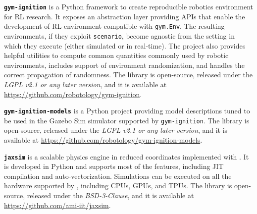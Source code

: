 \vspace{3mm}
\noindent
\textbf{\texttt{gym-ignition}} is a Python framework to create reproducible robotics environment for \ac{RL} research. It exposes an abstraction layer providing \acp{API} that enable the development of \ac{RL} environment compatible with \texttt{gym.Env}. The resulting environments, if they exploit \texttt{scenario},  become agnostic from the setting in which they execute (either simulated or in real-time). The project also provides helpful utilities to compute common quantities commonly used by robotic environments, includes support of environment randomization, and handles the correct propagation of randomness. The library is open-source, released under the \emph{LGPL v2.1 or any later version}, and it is available at \linebreak \url{https://github.com/robotology/gym-ignition}.

\vspace{3mm}
\noindent
\textbf{\texttt{gym-ignition-models}} is a Python project providing model descriptions tuned to be used in the Gazebo Sim simulator supported by \texttt{gym-ignition}. The library is open-source, released under the \emph{LGPL v2.1 or any later version}, and it is available at \url{https://github.com/robotology/gym-ignition-models}.

\vspace{3mm}
\noindent
\textbf{\texttt{jaxsim}} is a scalable physics engine in reduced coordinates implemented with \jax. It is developed in Python and supports most of the \jax features, including \ac{JIT} compilation and auto-vectorization. Simulations can be executed on all the hardware supported by \jax, including \acp{CPU}, \acp{GPU}, and \acp{TPU}. The library is open-source, released under the \emph{BSD-3-Clause}, and it is available at \linebreak \url{https://github.com/ami-iit/jaxsim}.
